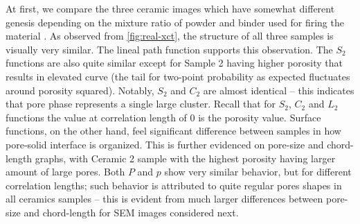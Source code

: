 \documentclass[1p]{elsarticle}
\begin{document}
At first, we compare the three ceramic images which have somewhat different
genesis depending on the mixture ratio of powder and binder used for firing the
material \cite{ceramics}. As observed from \cref{fig:real-xct}, the structure of
all three samples is visually very similar. The lineal path function supports
this observation. The $S_2$ functions are also quite similar except for Sample 2
having higher porosity that results in elevated curve (the tail for two-point
probability as expected fluctuates around porosity squared). Notably, $S_2$ and
$C_2$ are almost identical -- this indicates that pore phase represents a single
large cluster. Recall that for $S_2$, $C_2$ and $L_2$ functions the value at
correlation length of 0 is the porosity value. Surface functions, on the other
hand, feel significant difference between samples in how pore-solid interface is
organized. This is further evidenced on pore-size and chord-length graphs, with
Ceramic 2 sample with the highest porosity having larger amount of large
pores. Both $P$ and $p$ show very similar behavior, but for different
correlation lengths; such behavior is attributed to quite regular pores shapes
in all ceramics samples -- this is evident from much larger differences between
pore-size and chord-length for SEM images considered next.
\end{document}
